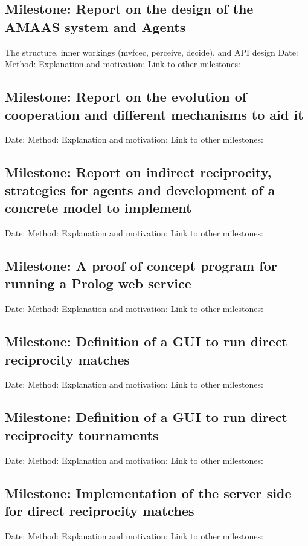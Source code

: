 \documentclass{article}
\begin{document}
\subsection*{Milestone: Report on the design of the AMAAS system and Agents}
The structure, inner workings (mvfcec, perceive, decide), and API design
Date:
Method: 
Explanation and motivation:
Link to other milestones:

\subsection*{Milestone: Report on the evolution of cooperation and different mechanisms to aid it}
Date:
Method: 
Explanation and motivation:
Link to other milestones:

\subsection*{Milestone: Report on indirect reciprocity, strategies for agents and development of a concrete model to implement}
Date:
Method: 
Explanation and motivation:
Link to other milestones:

\subsection*{Milestone: A proof of concept program for running a Prolog web service}
Date:
Method: 
Explanation and motivation:
Link to other milestones:

\subsection*{Milestone: Definition of a GUI to run direct reciprocity matches}
Date:
Method: 
Explanation and motivation:
Link to other milestones:

\subsection*{Milestone: Definition of a GUI to run direct reciprocity tournaments}
Date:
Method: 
Explanation and motivation:
Link to other milestones:

\subsection*{Milestone: Implementation of the server side for direct reciprocity matches}
Date:
Method: 
Explanation and motivation:
Link to other milestones:
\end{document}

